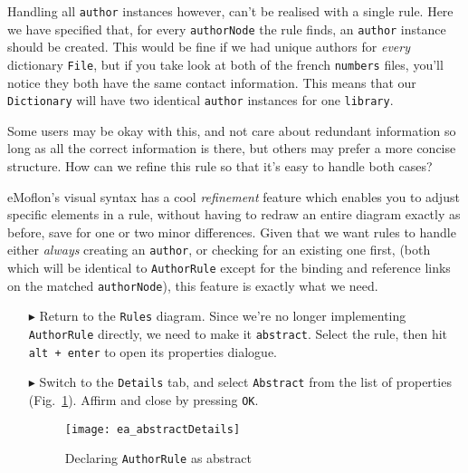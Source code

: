 Handling all \texttt{author} instances however, can't be realised with a single rule. Here we have specified that, for every \texttt{authorNode} the rule
finds, an \texttt{author} instance should be created. This would be fine if we had unique authors for \emph{every} dictionary \texttt{File}, but if you take
look at both of the french \texttt{numbers} files, you'll notice they both have the same contact information. This means that our \texttt{Dictionary} will have
two identical \texttt{author} instances for one \texttt{library}.

Some users may be okay with this, and not care about redundant information so long as all the correct information is there, but others may prefer a
more concise structure. How can we refine this rule so that it's easy to handle both cases?

eMoflon's visual syntax has a cool \emph{refinement} feature which enables you to adjust specific elements in a rule, without having to redraw an entire
diagram exactly as before, save for one or two minor differences. Given that we want rules to handle either \emph{always} creating an \texttt{author}, or
checking for an existing one first, (both which will be identical to \texttt{AuthorRule} except for the binding and reference links on the matched
\texttt{authorNode}), this feature is exactly what we need.

\begin{itemize}

\item[$\blacktriangleright$] Return to the \texttt{Rules} diagram. Since we're no longer implementing \texttt{AuthorRule} directly, we need to make it
\texttt{abstract}. Select the rule, then hit \texttt{alt + enter} to open its properties dialogue.

\item[$\blacktriangleright$] Switch to the \texttt{Details} tab, and select \texttt{Abstract} from the list of properties (Fig.~\ref{ea:abstractDetails}). 
Affirm and close by pressing \texttt{OK}.

\vspace{0.5cm}

\begin{figure}[htbp]
\begin{center}
  \texttt{[image: ea\_abstractDetails]}
  \caption{Declaring \texttt{AuthorRule} as abstract}
  \label{ea:abstractDetails}
\end{center}
\end{figure}

\end{itemize}

